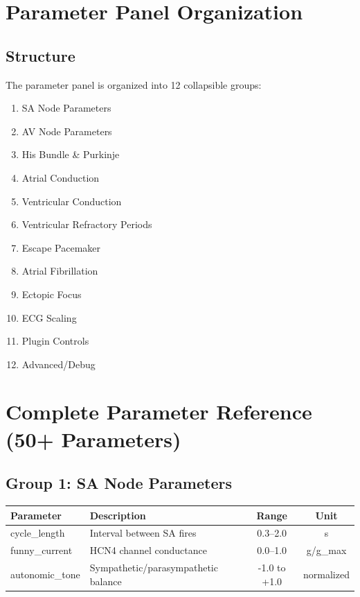 \documentclass[11pt, a4paper]{article}
\begin{document}
\section{Parameter Panel Organization}

\subsection{Structure}
The parameter panel is organized into 12 collapsible groups:

\begin{enumerate}
    \item SA Node Parameters
    \item AV Node Parameters
    \item His Bundle \& Purkinje
    \item Atrial Conduction
    \item Ventricular Conduction
    \item Ventricular Refractory Periods
    \item Escape Pacemaker
    \item Atrial Fibrillation
    \item Ectopic Focus
    \item ECG Scaling
    \item Plugin Controls
    \item Advanced/Debug
\end{enumerate}

\newpage
\section{Complete Parameter Reference (50+ Parameters)}

\subsection{Group 1: SA Node Parameters}

\begin{tabularx}{\textwidth}{|l|X|c|c|}
\hline
\textbf{Parameter} & \textbf{Description} & \textbf{Range} & \textbf{Unit} \\
\hline
cycle\_length & Interval between SA fires & 0.3--2.0 & s \\
funny\_current & HCN4 channel conductance & 0.0--1.0 & g/g\_max \\
autonomic\_tone & Sympathetic/parasympathetic balance & -1.0 to +1.0 & normalized \\
\hline
\end{tabularx}
\end{document}
